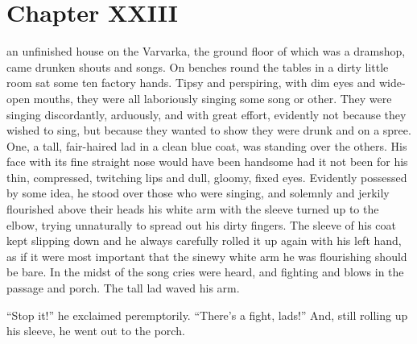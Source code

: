 
\chapter*{Chapter XXIII} \ifaudio {}
\fi

 an unfinished house on the Varvarka, the ground floor of
which was a dramshop, came drunken shouts and songs. On benches
round the tables in a dirty little room sat some ten factory
hands. Tipsy and perspiring, with dim eyes and wide-open mouths,
they were all laboriously singing some song or other. They were
singing discordantly, arduously, and with great effort, evidently
not because they wished to sing, but because they wanted to show
they were drunk and on a spree. One, a tall, fair-haired lad in a
clean blue coat, was standing over the others. His face with its
fine straight nose would have been handsome had it not been for
his thin, compressed, twitching lips and dull, gloomy, fixed
eyes.  Evidently possessed by some idea, he stood over those who
were singing, and solemnly and jerkily flourished above their
heads his white arm with the sleeve turned up to the elbow,
trying unnaturally to spread out his dirty fingers. The sleeve of
his coat kept slipping down and he always carefully rolled it up
again with his left hand, as if it were most important that the
sinewy white arm he was flourishing should be bare.  In the midst
of the song cries were heard, and fighting and blows in the
passage and porch. The tall lad waved his arm.

``Stop it!'' he exclaimed peremptorily. ``There's a fight,
lads!'' And, still rolling up his sleeve, he went out to the
porch.


